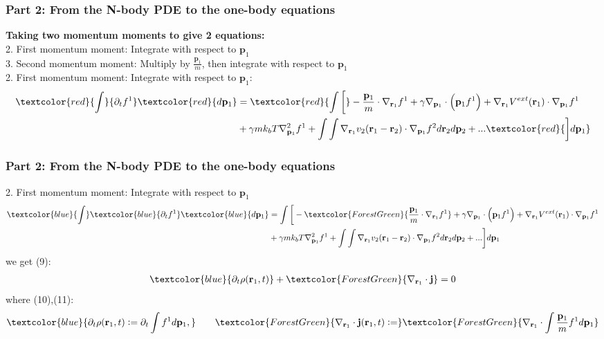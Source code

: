 \documentclass[aspectratio=169,xcolor=dvipsnames]{beamer}
\begin{document}
\begin{frame}
	\frametitle{Part 2: From the N-body PDE to the one-body equations}
	\vspace{0.5 cm}
	\textbf{Taking two momentum moments to give 2 equations:}\\
	2. First momentum moment: Integrate with respect to $\mathbf{p}_1$\\
	3. Second momentum moment: Multiply by $\frac{\mathbf{p}_1}{m}$, then integrate with respect to $\mathbf{p}_1$\\
	\vspace{1 cm}
	2. First momentum moment: Integrate with respect to $\mathbf{p}_1$:
\begin{align*}
\textcolor{red}{\int}{\partial_t f^1} \textcolor{red}{d \mathbf{p}_1}&= \textcolor{red}{\int \bigg[} - \frac{\mathbf{p}_1}{m} \cdot \nabla_{\mathbf{r}_1}f^1 + \gamma \nabla_{\mathbf{p}_1} \cdot \left(\mathbf{p}_1 f^1\right)
+ {\nabla_{\mathbf{r}_1}V^{ext}(\mathbf{r}_1)} \cdot \nabla_{\mathbf{p}_1}f^1\\
&+ \gamma mk_bT \nabla^2_{\mathbf{p}_1} f^1 + \int \int {\nabla_{\mathbf{r}_1}v_2(\mathbf{r}_1 - \mathbf{r}_2)} \cdot \nabla_{\mathbf{p}_1}f^2 d \mathbf{r}_2 d \mathbf{p}_2 + ... \textcolor{red}{\bigg] d \mathbf{p}_1}
\end{align*}

	
	
\end{frame}


\begin{frame}
	\frametitle{Part 2: From the N-body PDE to the one-body equations}
	2. First momentum moment: Integrate with respect to $\mathbf{p}_1$
	\begin{align*}
	\textcolor{blue}{\int}\textcolor{blue}{\partial_t f^1} \textcolor{blue}{d \mathbf{p}_1}&= {\int \bigg[} - \textcolor{ForestGreen}{\frac{\mathbf{p}_1}{m} \cdot \nabla_{\mathbf{r}_1}f^1} + \gamma \nabla_{\mathbf{p}_1} \cdot \left(\mathbf{p}_1 f^1\right)
	+ {\nabla_{\mathbf{r}_1}V^{ext}(\mathbf{r}_1)} \cdot \nabla_{\mathbf{p}_1}f^1\\
	&+ \gamma mk_bT \nabla^2_{\mathbf{p}_1} f^1 + \int \int {\nabla_{\mathbf{r}_1}v_2(\mathbf{r}_1 - \mathbf{r}_2)} \cdot \nabla_{\mathbf{p}_1}f^2 d \mathbf{r}_2 d \mathbf{p}_2 + ... {\bigg] d \mathbf{p}_1}
	\end{align*}
	we get (9):
	\begin{align*}
	\textcolor{blue}{\partial_t \rho(\mathbf{r}_1,t)} + \textcolor{ForestGreen}{\nabla_{\mathbf{r}_1} \cdot \mathbf{j}} = 0
	\end{align*}	
	where (10),(11):
	\begin{align*}
	\textcolor{blue}{\partial_t\rho(\mathbf{r}_1,t) :=\partial_t \int f^1 d \mathbf{p}_1,} \qquad
	\textcolor{ForestGreen}{\nabla_{\mathbf{r}_1} \cdot \mathbf{j}(\mathbf{r}_1,t) :=} \textcolor{ForestGreen}{\nabla_{\mathbf{r}_1} \cdot \int \frac{\mathbf{p}_1}{m}f^1 d \mathbf{p}_1}
	\end{align*}
	
	
\end{frame}
\end{document}
